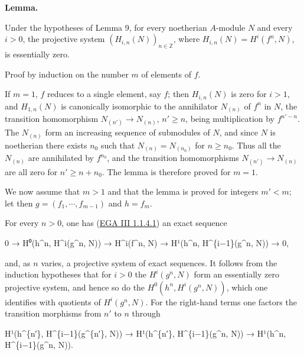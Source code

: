 \documentclass[
  11pt,
  a4paper,
]{book}
\newenvironment{Shaded}{}{}
\newcommand{\NormalTok}[1]{#1}
\begin{document}
\textbf{Lemma.}

Under the hypotheses of Lemma 9, for every noetherian \(A\)-module \(N\)
and every \(i > 0\), the projective system
\((H_{i,n}(N))_{n \in \mathbb{Z}}\), where
\(H_{i,n}(N) = H^{i}(f^{n}, N)\), is essentially zero.

Proof by induction on the number \(m\) of elements of \(f\).

If \(m = 1\), \(f\) reduces to a single element, say \(f\); then
\(H_{i,n}(N)\) is zero for \(i > 1\), and \(H_{1,n}(N)\) is canonically
isomorphic to the annihilator \(N_{(n)}\) of \(f^{n}\) in \(N\), the
transition homomorphism \(N_{(n')} \to
N_{(n)}\), \(n' \geqslant n\), being multiplication by \(f^{n' - n}\).
The \(N_{(n)}\) form an increasing sequence of submodules of \(N\), and
since \(N\) is noetherian there exists \(n_{0}\) such that
\(N_{(n)} = N_{(n_{0})}\) for \(n \geqslant
n_{0}\). Thus all the \(N_{(n)}\) are annihilated by \(f^{n_{0}}\), and
the transition homomorphisms \(N_{(n')} \to N_{(n)}\) are all zero for
\(n' \geqslant n + n_{0}\). The lemma is therefore proved for \(m = 1\).

We now assume that \(m > 1\) and that the lemma is proved for integers
\(m' < m\); let then \(g = (f_{1}, \cdots, f_{m-1})\) and \(h = f_{m}\).

For every \(n > 0\), one has
(\href{https://jcreinhold.github.io/ega/iii/08-ch3-01-cohomology-affine-schemes.html\#11-review-of-the-exterior-algebra-complex}{EGA
III 1.1.4.1}) an exact sequence

\begin{Shaded}
\begin{Highlighting}[]
\NormalTok{0 → H⁰(h\^{}n, H\^{}i(g\^{}n, N)) → H\^{}i(f\^{}n, N) → H¹(h\^{}n, H\^{}\{i−1\}(g\^{}n, N)) → 0,}
\end{Highlighting}
\end{Shaded}

and, as \(n\) varies, a projective system of exact sequences. It follows
from the induction hypotheses that for \(i > 0\) the \(H^{i}(g^{n}, N)\)
form an essentially zero projective system, and hence so do the
\(H^{0}(h^{n}, H^{i}(g^{n}, N))\), which one identifies with quotients
of \(H^{i}(g^{n}, N)\). For the right-hand terms one factors the
transition morphisms from \(n'\) to \(n\) through

\begin{Shaded}
\begin{Highlighting}[]
\NormalTok{H¹(h\^{}\{n′\}, H\^{}\{i−1\}(g\^{}\{n′\}, N)) → H¹(h\^{}\{n′\}, H\^{}\{i−1\}(g\^{}n, N)) → H¹(h\^{}n, H\^{}\{i−1\}(g\^{}n, N)).}
\end{Highlighting}
\end{Shaded}
\end{document}
